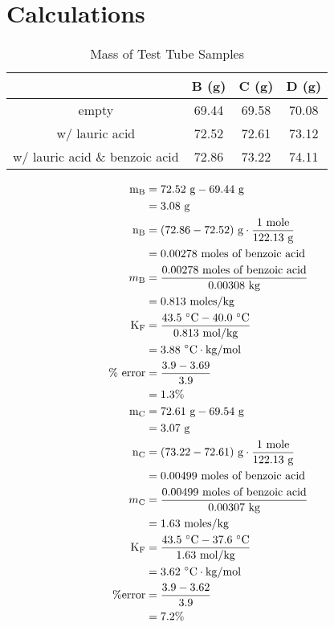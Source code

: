 \documentclass[12pt]{article}
\begin{document}
    \section*{Calculations}
        \begin{table}[h]
            \centering
            \caption{Mass of Test Tube Samples}
            \begin{tabular}{c|ccc}
                & B (g) & C (g) & D (g)\\
                \hline
                empty & 69.44 & 69.58 & 70.08\\
                w/ lauric acid & 72.52 & 72.61 & 73.12\\
                w/ lauric acid \& benzoic acid & 72.86 & 73.22 & 74.11
            \end{tabular}
        \end{table}
        \begin{align*}
            \text{m}_\text{B} &= 72.52 \text{ g} - 69.44 \text{ g}\\
            &= 3.08 \text{ g}\\
            \text{n}_\text{B} &= (72.86-72.52) \text{ g} \cdot \frac{1 \text{ mole}}{122.13 \text{ g}}\\
            &= 0.00278~\text{moles of benzoic acid}\\
            m_\mathrm{B} &= \frac{0.00278~\text{moles of benzoic acid}}{0.00308\text{ kg}}\\
            &= 0.813 \text{ moles/kg}\\
            \mathrm{K_F} & = \frac{43.5~\mathrm{\degree C} - 40.0~\mathrm{\degree C}}{0.813 \text{ mol/kg}}\\
            &= 3.88~\mathrm{\degree C\cdot kg / mol}\\
            \text{\% error} &= \frac{3.9-3.69}{3.9}\\
            &=1.3\%\\
            \text{m}_\text{C} &= 72.61 \text{ g} - 69.54 \text{ g}\\
            &= 3.07 \text{ g}\\
            \text{n}_\text{C} &= (73.22-72.61) \text{ g} \cdot \frac{1 \text{ mole}}{122.13 \text{ g}}\\
            &= 0.00499~\text{moles of benzoic acid}\\
            m_\mathrm{C} &= \frac{0.00499~\text{moles of benzoic acid}}{0.00307\text{ kg}}\\
            &= 1.63 \text{ moles/kg}\\
            \mathrm{K_F} & = \frac{43.5~\mathrm{\degree C} - 37.6~\mathrm{\degree C}}{1.63 \text{ mol/kg}}\\
            &= 3.62~\mathrm{\degree C\cdot kg / mol}\\
            \text{\%error} &= \frac{3.9-3.62}{3.9}\\
            &= 7.2\%
        \end{align*}
\end{document}
